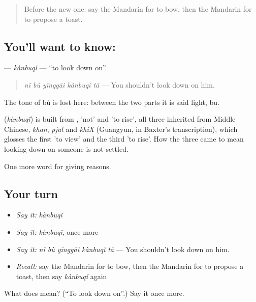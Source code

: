 \label{lesson:ZH-C361-kanbuqi}



\begin{quote}
Before the new one: say the Mandarin for to bow, then the Mandarin for to propose a toast.
\end{quote}

\subsection*{You'll want to know: }
\textbf{} — \emph{kànbuqǐ} — \textquotedblleft{}to look down on\textquotedblright{}.

\begin{quote}
\textbf{} \emph{nǐ bù yīnggāi kànbuqǐ tā} — You shouldn't look down on him.
\end{quote}

The tone of bù is lost here: between the two parts it is said light, bu.

\begin{cousinweb}
\textbf{} (\emph{kànbuqǐ}) is built from ,  'not' and  'to rise', all three inherited from Middle Chinese, \emph{khan}, \emph{pjut} and \emph{khiX} (Guangyun, in Baxter's transcription), which glosses the first 'to view' and the third 'to rise'. How the three came to mean looking down on someone is not settled.
\end{cousinweb}

\begin{grammarlens}[title={What you've built}]
One more word for giving reasons.
\end{grammarlens}

\subsection*{Your turn}
\begin{itemize}
\raggedright
  \item \emph{Say it:} \emph{kànbuqǐ}
  \item \emph{Say it:} \emph{kànbuqǐ}, once more
  \item \emph{Say it:} \emph{nǐ bù yīnggāi kànbuqǐ tā} — You shouldn't look down on him.
  \item \emph{Recall:} say the Mandarin for to bow, then the Mandarin for to propose a toast, then say \emph{kànbuqǐ} again
\end{itemize}

\begin{tcolorbox}[breakable,colback=teal!4,colframe=teal!35!black,title={Before you move on}]
What does  mean? (\textquotedblleft{}To look down on\textquotedblright{}.) Say it once more.
\end{tcolorbox}
